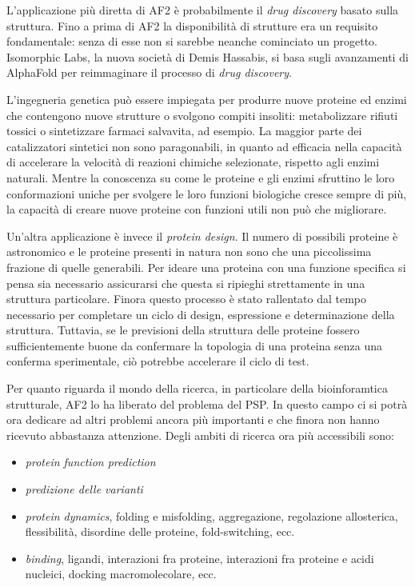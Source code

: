 L'applicazione più diretta di AF2 è probabilmente il \textit{drug discovery} basato sulla struttura. Fino a prima di AF2 la disponibilità di strutture era un requisito fondamentale: senza di esse non si sarebbe neanche cominciato un progetto. Isomorphic Labs, la nuova società di Demis Hassabis, si basa sugli avanzamenti di AlphaFold per reimmaginare il processo di \textit{drug discovery}.

\par L'ingegneria genetica può essere impiegata per produrre nuove proteine ed enzimi che contengono nuove strutture o svolgono compiti insoliti: metabolizzare rifiuti tossici o sintetizzare farmaci salvavita, ad esempio. La maggior parte dei catalizzatori sintetici non sono paragonabili, in quanto ad efficacia nella capacità di accelerare la velocità di reazioni chimiche selezionate, rispetto agli enzimi naturali. Mentre la conoscenza su come le proteine e gli enzimi sfruttino le loro conformazioni uniche per svolgere le loro funzioni biologiche cresce sempre di più, la capacità di creare nuove proteine con funzioni utili non può che migliorare\supercite{alberts2018essential}.

\par Un'altra applicazione è invece il \textit{protein design}. Il numero di possibili proteine è astronomico e le proteine presenti in natura non sono che una piccolissima frazione di quelle generabili. Per ideare una proteina con una funzione specifica si pensa sia necessario assicurarsi che questa si ripieghi strettamente in una struttura particolare. Finora questo processo è stato rallentato dal tempo necessario per completare un ciclo di design, espressione e determinazione della struttura. Tuttavia, se le previsioni della struttura delle proteine fossero sufficientemente buone da confermare la topologia di una proteina senza una conferma sperimentale, ciò potrebbe accelerare il ciclo di test. \\

\par Per quanto riguarda il mondo della ricerca, in particolare della bioinforamtica strutturale, AF2 lo ha liberato del problema del PSP. In questo campo ci si potrà ora dedicare ad altri problemi ancora più importanti e che finora non hanno ricevuto abbastanza attenzione. Degli ambiti di ricerca ora più accessibili sono:

\begin{itemize}
	\item \textit{protein function prediction} 
	\item \textit{predizione delle varianti}
	\item \textit{protein dynamics}, folding e misfolding, aggregazione, regolazione allosterica, flessibilità, disordine delle proteine, fold-switching, ecc.
	\item \textit{binding}, ligandi, interazioni fra proteine, interazioni fra proteine e acidi nucleici, docking macromolecolare, ecc.
\end{itemize}

